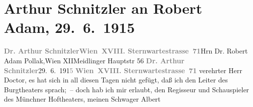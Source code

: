

         
         \newcommand{\erwaehntePersonen}{Personen: Robert Adam, Albert Steinrück, Hugo Thimig}
         \newcommand{\erwaehnteInstitutionen}{Institutionen: Königliche Hof- und Nationaltheater München}
         \newcommand{\erwaehnteOrte}{Orte: Burgtheater, Meidlinger Hauptstraße, Sternwartestraße, Villa Annerl, Villa Zufriedenheit, Wien, XII., Meidling}
         \newcommand{\erwaehnteWerke}{Werke: Der Fremde, Die Geschichte des Alî ibn Bekkâr mit Schams an-Nahâr, Fatme}
               \section[Arthur Schnitzler an Robert Adam, 29. 6. 1915]{ Arthur Schnitzler an Robert Adam, 29. 6. 1915}\nopagebreak{}\rehead{ }\begin{ledgroupsized}[t]{13cm}\normalsize\beginnumbering \toendnotes[C]{\smallbreak\pagebreak[2]} 
\toendnotes[C]{\smallbreak}\pstart{}{\pb}\textcolor{gray}{\textbf{Dr. Arthur Schnitzler}}\pend{}\pstart{}\textcolor{gray}{\textbf{Wien XVIII. Sternwartestrasse 71}}\pend{}{\bigskip}\pstart{}{\pb}Hrn Dr. Robert Adam Pollak,\pend{}\pstart{}Wien XII\pend{}\pstart{}Meidlinger Hauptstr 56\pend{}{\bigskip}\pstart
           \noindent{}{\pb}\textcolor{gray}{\textbf{Dr. Arthur Schnitzler}}\hfill 29. 6. 191\textcolor{gray}{5}\pend
           \pstart
           \textcolor{gray}{\textbf{Wien XVIII. Sternwartestrasse 71}}\pend
           \pstart
           verehrter Herr Doctor, es hat sich in all diesen Tagen nicht
                    gefügt, daß ich den Leiter
                    des Burgtheaters sprach; – doch hab ich mir
                    erlaubt, den Regisseur und Schauspieler des Münchner
                        Hoftheaters, meinen Schwager Albert

\end{ledgroupsized}

